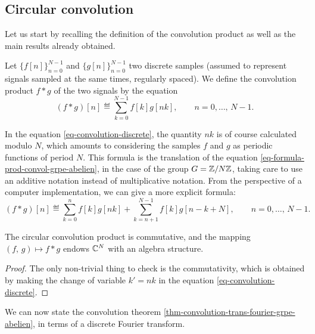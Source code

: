 \subsection{Circular convolution}
\label{sect1-convolution-circular} 
 
 Let us start by recalling the definition of the convolution product as well as the main results already obtained.
 
\begin{defn}
 Let $ \{f[n]\}_{n = 0}^{N-1} $ and $ \{g [n]\}_{n = 0}^{N-1} $ two discrete samples (assumed to represent signals sampled at the same times, regularly spaced). We define the convolution product $ f * g $ of the two signals by the equation
\begin{equation}
\label{eq-convolution-discrete}
(f * g) [n] \eqdef \sum_{k = 0}^{N-1}{f[k] g [nk]}, \quad \quad n = 0, \ldots, \, N-1 .
\end{equation}
\end{defn}
 
 
\begin{rem}
In the equation \eqref{eq-convolution-discrete}, the quantity $ nk $ is of course calculated modulo $N$, which amounts to considering the samples $ f $ and $ g $ as periodic functions of period $N$. This formula is the translation of the equation \eqref{eq-formula-prod-convol-grpe-abelien}, in the case of the group $ G = \mathbb{Z}/N \mathbb{Z} $, taking care to use an additive notation instead of multiplicative notation. From the perspective of a computer implementation, we can give a more explicit formula:
\begin{equation*}
(f * g) [n] \eqdef \sum_{k = 0}^{n}{f[k] g [nk]} + \sum_{k = n + 1}^{N-1}{f[ k] g [n-k + N]}, \quad \quad n = 0, \ldots, \, N-1.
\end{equation*}
\end{rem}
 
 
\begin{prop}
The circular convolution product is commutative, and the mapping $ (f, \, g) \mapsto f * g $ endows $ \mathbb{C}^N $ with an algebra structure.
\end{prop}
\begin{proof}
The only non-trivial thing to check is the commutativity, which is obtained by making the change of variable $ k'= nk $ in the equation \eqref{eq-convolution-discrete}.
\end{proof}
We can now state the convolution theorem \ref{thm-convolution-trans-fourier-grpe-abelien}, in terms of a discrete Fourier transform.
 
